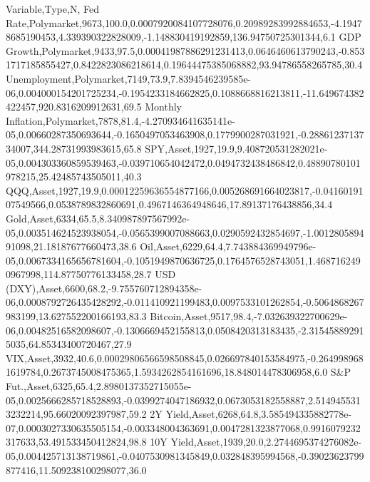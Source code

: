 Variable,Type,N,%
Fed Rate,Polymarket,9673,100.0,0.0007920084107728076,0.20989283992884653,-4.19478685190453,4.339390322828009,-1.148830419192859,136.94750725301344,6.1
GDP Growth,Polymarket,9433,97.5,0.00041987886291231413,0.0646460613790243,-0.8531717185855427,0.8422823086218614,0.19644475385068882,93.94786558265785,30.4
Unemployment,Polymarket,7149,73.9,7.8394546239585e-06,0.004000154201725234,-0.1954233184662825,0.1088668816213811,-11.649674382422457,920.8316209912631,69.5
Monthly Inflation,Polymarket,7878,81.4,-4.270934641635141e-05,0.00660287350693644,-0.1650497053463908,0.1779900287031921,-0.2886123713734007,344.28731993983615,65.8
SPY,Asset,1927,19.9,9.408720531282021e-05,0.004303360859539463,-0.039710654042472,0.0494732438486842,0.48890780101978215,25.42485743505011,40.3
QQQ,Asset,1927,19.9,0.00012259636554877166,0.005268691664023817,-0.0416019107549566,0.0538789832860691,0.4967146364948646,17.89137176438856,34.4
Gold,Asset,6334,65.5,8.340987897567992e-05,0.003514624523938054,-0.0565399007088663,0.0290592432854697,-1.001280589491098,21.18187677660473,38.6
Oil,Asset,6229,64.4,7.743884369949796e-05,0.0067334165656781604,-0.1051949870636725,0.1764576528743051,1.4687162490967998,114.87750776133458,28.7
USD (DXY),Asset,6600,68.2,-9.755760712894358e-06,0.0008792726435428292,-0.011410921199483,0.0097533101262854,-0.5064868267983199,13.627552200166193,83.3
Bitcoin,Asset,9517,98.4,-7.032639322700629e-06,0.00482516582098607,-0.1306669452155813,0.0508420313183435,-2.315458892915035,64.85343400720467,27.9
VIX,Asset,3932,40.6,0.00029806566598508845,0.026697840153584975,-0.2649989681619784,0.2673745008475365,1.5934262854161696,18.848014478306958,6.0
S&P Fut.,Asset,6325,65.4,2.8980137352715055e-05,0.0025666285718528893,-0.0399274047186932,0.0673053182558887,2.5149455313232214,95.66020092397987,59.2
2Y Yield,Asset,6268,64.8,3.585494335882778e-07,0.0003027330635505154,-0.003348004363691,0.0047281323877068,0.9916079232317633,53.491533450412824,98.8
10Y Yield,Asset,1939,20.0,2.2744695374276082e-05,0.004425713138719861,-0.0407530981345849,0.032848395994568,-0.39023623799877416,11.509238100298077,36.0
